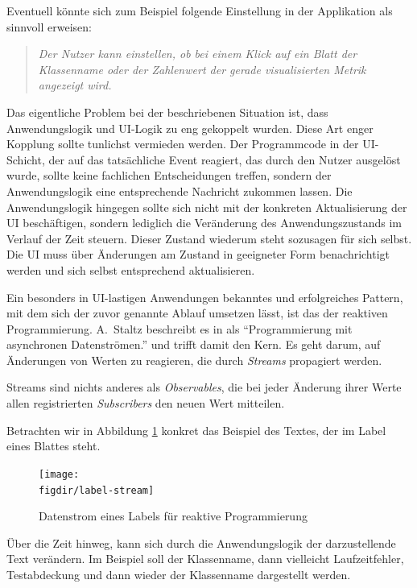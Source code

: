 Eventuell könnte sich zum Beispiel folgende Einstellung in der Applikation als sinnvoll erweisen:

\begin{quotation}
  \textit{Der Nutzer kann einstellen, ob bei einem Klick auf ein Blatt der Klassenname oder der Zahlenwert der gerade visualisierten Metrik angezeigt wird.}
\end{quotation}

Das eigentliche Problem bei der beschriebenen Situation ist, dass Anwendungslogik und UI-Logik zu eng gekoppelt wurden. Diese Art enger Kopplung sollte tunlichst vermieden werden. Der Programmcode in der UI-Schicht, der auf das tatsächliche Event reagiert, das durch den Nutzer ausgelöst wurde, sollte keine fachlichen Entscheidungen treffen, sondern der Anwendungslogik eine entsprechende Nachricht zukommen lassen. Die Anwendungslogik hingegen sollte sich nicht mit der konkreten Aktualisierung der UI beschäftigen, sondern lediglich die Veränderung des Anwendungszustands im Verlauf der Zeit steuern. Dieser Zustand wiederum steht sozusagen für sich selbst. Die UI muss über Änderungen am Zustand in geeigneter Form benachrichtigt werden und sich selbst entsprechend aktualisieren.

Ein besonders in UI-lastigen Anwendungen bekanntes und erfolgreiches Pattern, mit dem sich der zuvor genannte Ablauf umsetzen lässt, ist das der reaktiven Programmierung. A.\ Staltz beschreibt es in \cite{staltz2016introduction} als "`Programmierung mit asynchronen Datenströmen."' und trifft damit den Kern. Es geht darum, auf Änderungen von Werten zu reagieren, die durch \textit{Streams} propagiert werden.

Streams sind nichts anderes als \textit{Observables}, die bei jeder Änderung ihrer Werte allen registrierten \textit{Subscribers} den neuen Wert mitteilen.

Betrachten wir in Abbildung \ref{fig:label-stream} konkret das Beispiel des Textes, der im Label eines Blattes steht.

\begin{figure}[htb]
  \texttt{[image: \\figdir/label-stream]}
  \caption{Datenstrom eines Labels für reaktive Programmierung}
  \label{fig:label-stream}
\end{figure}

Über die Zeit hinweg, kann sich durch die Anwendungslogik der darzustellende Text verändern. Im Beispiel soll der Klassenname, dann vielleicht Laufzeitfehler, Testabdeckung und dann wieder der Klassenname dargestellt werden.

